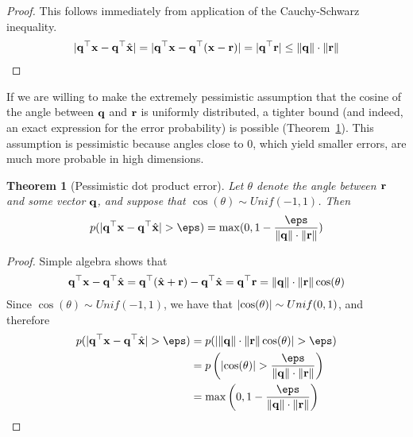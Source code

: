 \documentclass[]{article}
\newtheorem{theorem}{Theorem}[section]
\begin{document}
\begin{proof} \label{thm:dot_unif}
This follows immediately from application of the Cauchy-Schwarz inequality.
\begin{align}
    \lvert\mathbf{q}^\top \mathbf{x} - \mathbf{q}^\top \hat{\mathbf{x}}\rvert = \lvert\mathbf{q}^\top \mathbf{x} - \mathbf{q}^\top (\mathbf{x} - \mathbf{r})\rvert = \lvert\mathbf{q}^\top \mathbf{r}\rvert \le \lVert\mathbf{q}\rVert \cdot \lVert\mathbf{r}\rVert
\end{align}
\end{proof}


If we are willing to make the extremely pessimistic assumption that the cosine of the angle between $\mathbf{q}$ and $\mathbf{r}$ is uniformly distributed, a tighter bound (and indeed, an exact expression for the error probability) is possible (Theorem~\ref{thm:dot_unif}). This assumption is pessimistic because angles close to $0$, which yield smaller errors, are much more probable in high dimensions. %

\begin{theorem}[Pessimistic dot product error] \label{thm:dot_unif}
Let $\theta$ denote the angle between $\mathbf{r}$ and some vector $\mathbf{q}$, and suppose that $\cos(\theta) \sim Unif(-1, 1)$. Then
\begin{align}
    p(\abs{\q^\top \x - \q^\top \xhat} > \eps) = \max(0, 1 - \frac{\eps}{\norm{\q} \cdot \norm{\r}})
\end{align}
\end{theorem}

\begin{proof}
Simple algebra shows that
\begin{align} \label{eq:qTr}
    \mathbf{q}^\top \mathbf{x} - \mathbf{q}^\top \hat{\mathbf{x}} = \mathbf{q}^\top(\hat{\mathbf{x}} + \mathbf{r}) - \mathbf{q}^\top \hat{\mathbf{x}} = \mathbf{q}^\top \mathbf{r} = \lVert\mathbf{q}\rVert \cdot \lVert\mathbf{r}\rVert \cos(\theta)
\end{align}
Since $\cos(\theta) \sim Unif(-1, 1)$, we have that $\lvert\cos(\theta)\rvert \sim Unif(0, 1)$, and therefore
\begin{align}
    p(\abs{\q^\top \x - \q^\top \xhat} > \eps) &= p(\abs{\norm{\q} \cdot \norm{\r} \cos(\theta)} > \eps ) \\
    &= p \left( \abs{\cos(\theta)} > \frac{\eps}{\norm{\q} \cdot \norm{\r} } \right) \\
    &= \max \left( 0, 1 - \frac{\eps}{\norm{\q} \cdot \norm{\r}} \right)
\end{align}
\end{proof}
\end{document}
